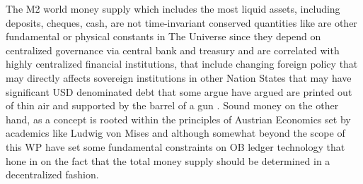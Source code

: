 \documentclass[final,5p,times,twocolumn,authoryear]{elsarticle}
\begin{document}
The M2 world money supply which includes the most liquid assets, including deposits, cheques, cash, are not time-invariant conserved quantities like are other fundamental or physical constants in The Universe since they depend on centralized governance via central bank and treasury and are correlated with highly centralized financial institutions, that include changing foreign policy that may directly affects sovereign institutions in other Nation States that may have significant USD denominated debt that some argue have argued are printed out of thin air and supported by the barrel of a gun \cite{chomsky2002understanding}. Sound money on the other hand, as a concept is rooted within the principles of Austrian Economics set by academics like Ludwig von Mises  \cite{Hansen2020Book} and although somewhat beyond the scope of this WP have set some fundamental constraints on OB ledger technology that hone in on the fact that the total money supply should be determined in a decentralized fashion.  
\end{document}
